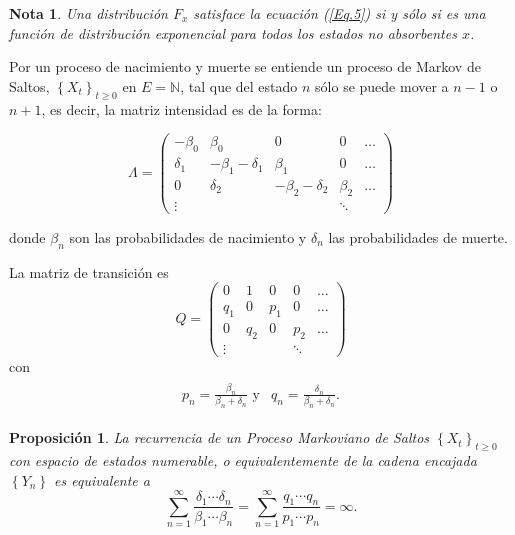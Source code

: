 \documentclass{article}
\newtheorem{Note}{Nota}[section]
\newtheorem{Prop}{Proposición}[section]
\newcommand{\nat}{\mathbb{N}}
\numberwithin{equation}{section}
\begin{document}
\begin{Note}
Una distribuci\'on $F_{x}$ satisface la ecuaci\'on (\ref{Eq.5}) si y s\'olo si es una funci\'on de distribuci\'on exponencial para todos los estados no absorbentes $x$.
\end{Note}

Por un proceso de nacimiento y muerte  se entiende un proceso de Markov de Saltos, $\left\{X_{t}\right\}_{t\geq0}$ en $E=\nat$, tal que del estado $n$ s\'olo se puede mover a $n-1$ o $n+1$, es decir, la matriz intensidad es de la forma:

\begin{equation}
\Lambda=\left(\begin{array}{ccccc}
-\beta_{0}&\beta_{0} & 0 & 0 & \ldots\\
\delta_{1}&-\beta_{1}-\delta_{1} & \beta_{1}&0&\ldots\\
0&\delta_{2}&-\beta_{2}-\delta_{2} & \beta_{2}&\ldots\\
\vdots & & & \ddots &
\end{array}\right)
\end{equation}

donde $\beta_{n}$ son las probabilidades de nacimiento y $\delta_{n}$ las probabilidades de muerte.

La matriz de transici\'on es
\begin{equation}
Q=\left(\begin{array}{ccccc}
0& 1 & 0 & 0 & \ldots\\
q_{1}&0 & p_{1}&0&\ldots\\
0&q_{2}&0& p_{2}&\ldots\\
\vdots & & & \ddots &
\end{array}\right)
\end{equation}
con 
\begin{eqnarray}
\begin{array}{ll}
p_{n}=\frac{\beta_{n}}{\beta_{n}+\delta_{n}}\textrm{  y}& q_{n}=\frac{\delta_{n}}{\beta_{n}+\delta_{n}}.
\end{array}
\end{eqnarray}

\begin{Prop}\label{Prop.2.1}
La recurrencia de un Proceso Markoviano de Saltos $\left\{X_{t}\right\}_{t\geq0}$ con espacio de estados numerable, o equivalentemente de la cadena encajada $\left\{Y_{n}\right\}$ es equivalente a
\begin{equation}\label{Eq.2.1}
\sum_{n=1}^{\infty}\frac{\delta_{1}\cdots\delta_{n}}{\beta_{1}\cdots\beta_{n}}=\sum_{n=1}^{\infty}\frac{q_{1}\cdots q_{n}}{p_{1}\cdots p_{n}}=\infty.
\end{equation}
\end{Prop}
\end{document}
